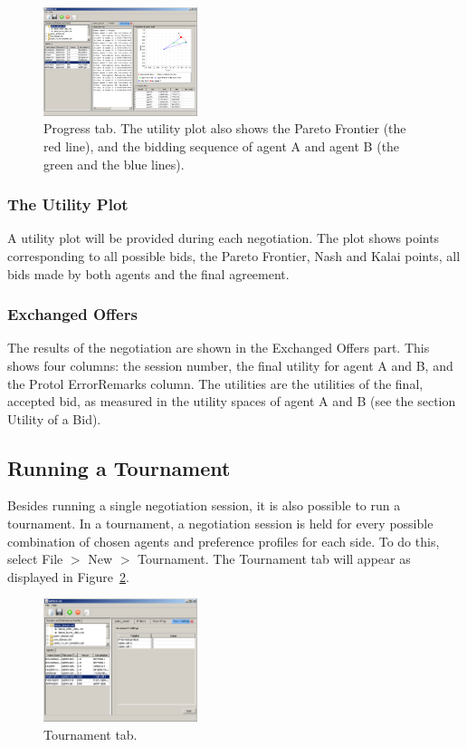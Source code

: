 \documentclass[]{article}
\begin{document}
\begin{figure}[htb]
	\centering
	\includegraphics[width=0.4\textwidth]{media/image15.png}
\caption{Progress tab. The utility plot also shows the Pareto Frontier (the red line), and the bidding sequence of agent A and agent B (the green and the blue lines).}\label{Fig:progress}
\end{figure}

\subsubsection{The Utility Plot}

A utility plot will be provided during each negotiation. The plot shows points corresponding to all possible bids, the Pareto Frontier, Nash and Kalai points, all bids made by both agents and the final agreement.

\subsubsection{Exchanged Offers}

The results of the negotiation are shown in the Exchanged Offers part. This shows four columns: the session number, the final utility for agent A and B, and the Protol ErrorRemarks column. The utilities are the utilities of the final, accepted bid, as measured in the utility spaces of agent A and B (see the section Utility of a Bid).

\subsection{Running a Tournament}

Besides running a single negotiation session, it is also possible to run a tournament. In a tournament, a negotiation session is held for every possible combination of chosen agents and preference profiles for each side. To do this, select File $>$ New $>$ Tournament. The Tournament tab will appear as displayed in Figure~\ref{Fig:tournament}. 
 
\begin{figure}[htb]
	\centering
	\includegraphics[width=0.4\textwidth]{media/image16.png}
\caption{Tournament tab.}\label{Fig:tournament}
\end{figure}
\end{document}
